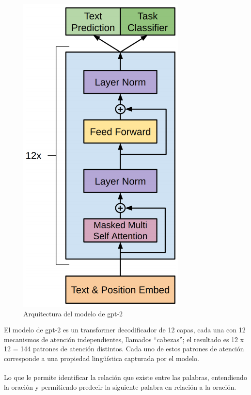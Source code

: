 \documentclass[12pt, a4paper, titlepage]{report}
\begin{document}
		    	\begin{figure}[H] \caption{Arquitectura del modelo de \acrshort{gpt}-2 \cite{refarquitecturagpt}}
		    		\includegraphics[scale=.5]{./imagenes/MarcoTeorico/GPTransformer.png}
		    		\centering 
		    	\end{figure}
		    
		    	El modelo de \acrshort{gpt}-2 es un transformer decodificador de 12 capas, cada una con 12 mecanismos de atención independientes, llamados “cabezas”; el resultado es 12 x 12 = 144 patrones de atención distintos. Cada uno de estos patrones de atención corresponde a una propiedad lingüística capturada por el modelo. \cite{refarquitecturagpt2} \\\\
		    	Lo que le permite identificar la relación que existe entre las palabras, entendiendo la oración y permitiendo predecir la siguiente palabra en relación a la oración.\par
		    	
\end{document}
